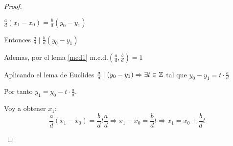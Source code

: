 \begin{proof}
\begin{enumerate}
		      \(\frac{a}{d}(x_1 - x_0) = \frac{b}{d} (y_0 - y_1)\)
		      
		      Entonces \(\frac{a}{d} \mid \frac{b}{d}(y_0 - y_1)\)
		      
		      Ademas, por el lema \ref{mcd1} \(\mathrm{m.c.d.}(\frac{a}{d}, \frac{b}{d}) = 1 \)
		      
		      Aplicando el lema de Euclides \(\frac{a}{d} \mid (y_0 - y_1)\Rightarrow \exists t \in \mathbb{Z}\) tal que \(y_0 - y_1 = t \cdot \frac{a}{d }\)
		      
		      Por tanto \(y_1 = y_0 - t \cdot \frac{a}{d }\).
		      
		      Voy a obtener \(x_1 \):
		      \[
			      \frac{a}{d} (x_1 - x_0) = \frac{b}{d} t \frac{a}{d} \Rightarrow x_1 - x_0 = \frac{b}{d} t \Rightarrow x_1 = x_0 + \frac{b}{d} t
		      \]
	\end{enumerate}
\end{proof}

